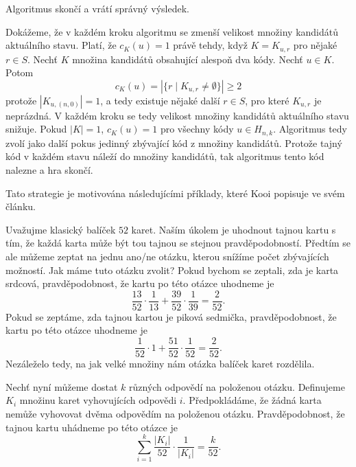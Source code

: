 \begin{tvrz}
    Algoritmus skončí a vrátí správný výsledek.
\end{tvrz}
\begin{dukaz}
    Dokážeme, že v každém kroku algoritmu se zmenší velikost množiny kandidátů aktuálního stavu. Platí, že $c_K(u) = 1$ právě tehdy, když $K = K_{u,r}$ pro nějaké $r \in S$. Nechť $K$ množina kandidátů obsahující alespoň dva kódy. Nechť $u \in K$. Potom 
    \[c_K(u) = |\{r \mid K_{u,r} \neq \emptyset\}| \geq 2\]
    protože $|K_{u,(n,0)}| = 1$, a tedy existuje nějaké další $r \in S$, pro které $K_{u,r}$ je neprázdná. V každém kroku se tedy velikost množiny kandidátů aktuálního stavu snižuje. Pokud $|K| = 1$, $c_K(u) = 1$ pro všechny kódy $u \in H_{n,k}$. Algoritmus tedy zvolí jako další pokus jedinný zbývající kód z množiny kandidátů. Protože tajný kód v každém stavu náleží do množiny kandidátů, tak algoritmus tento kód nalezne a hra skončí.
\end{dukaz}


Tato strategie je motivována následujícími příklady, které Kooi \cite{kooi} popisuje ve svém článku. 

\begin{prikl}\label{prdvecasti}
    Uvažujme klasický balíček $52$ karet. Naším úkolem je uhodnout tajnou kartu s tím, že každá karta může být tou tajnou se stejnou pravděpodobností. Předtím se ale můžeme zeptat na jednu ano/ne otázku, kterou snížíme počet zbývajících možností. Jak máme tuto otázku zvolit? 
    Pokud bychom se zeptali, zda je karta srdcová, pravděpodobnost, že kartu po této otázce uhodneme je 
    \[\frac{13}{52} \cdot \frac{1}{13} + \frac{39}{52} \cdot \frac{1}{39} = \frac{2}{52}.\]
    Pokud se zeptáme, zda tajnou kartou je piková sedmička, pravděpodobnost, že kartu po této otázce uhodneme je 
     \[\frac{1}{52} \cdot 1 + \frac{51}{52} \cdot \frac{1}{52} = \frac{2}{52}.\] 
    Nezáleželo tedy, na jak velké množiny nám otázka balíček karet rozdělila. 
\end{prikl}\textbf{}

\begin{prikl}
    Nechť nyní můžeme dostat $k$ různých odpovědí na položenou otázku. Definujeme $K_i$ množinu karet vyhovujících odpovědi $i$. Předpokládáme, že žádná karta nemůže vyhovovat dvěma odpovědím na položenou otázku. Pravděpodobnost, že tajnou kartu uhádneme po této otázce je 
\[\sum_{i = 1}^k \frac{|K_i|}{52} \cdot \frac{1}{|K_i|} = \frac{k}{52}.\]
\end{prikl}


